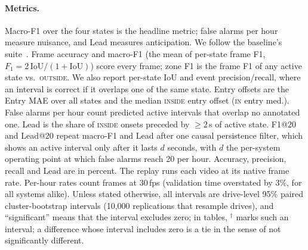 \documentclass[conference]{IEEEtran}
\let\oldtextsc\textsc
\renewcommand{\textsc}[1]{\mbox{\oldtextsc{#1}}}
\begin{document}
\paragraph{Metrics.} Macro-F1 over the four states is the headline metric; false alarms per hour measure nuisance, and Lead measures anticipation.  We follow the baseline's suite~\cite{priorsystem2026}.  Frame accuracy and macro-F1 (the mean of per-state frame F1, $F_1=2\,\mathrm{IoU}/(1+\mathrm{IoU})$) score every frame; zone F1 is the frame F1 of any active state vs.\ \textsc{outside}.  We also report per-state IoU and event precision/recall, where an interval is correct if it overlaps one of the same state.  Entry offsets are the Entry MAE over all states and the median \textsc{inside} entry offset (\textsc{in} entry med.).  False alarms per hour count predicted active intervals that overlap no annotated one.  Lead is the share of \textsc{inside} onsets preceded by $\geq$2\,s of active state.  F1@20 and Lead@20 repeat macro-F1 and Lead after one causal persistence filter, which shows an active interval only after it lasts $d$ seconds, with $d$ the per-system operating point at which false alarms reach 20 per hour.  Accuracy, precision, recall and Lead are in percent.  The replay runs each video at its native frame rate.  Per-hour rates count frames at 30\,fps (validation time overstated by 3\%, for all systems alike).  Unless stated otherwise, all intervals are drive-level 95\% paired cluster-bootstrap intervals (10{,}000 replications that resample drives), and ``significant'' means that the interval excludes zero; in tables, $^\dagger$ marks such an interval; a difference whose interval includes zero is a tie in the sense of not significantly different.
\end{document}
